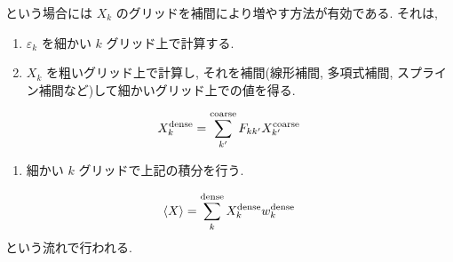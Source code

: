 \documentclass[letterpaper,10pt,dvipdfmx,openany]{sphinxmanual}
\begin{document}
\sphinxAtStartPar
という場合には \(X_k\) のグリッドを補間により増やす方法が有効である.
それは,
\begin{enumerate}
%
\item {} 
\sphinxAtStartPar
\(\varepsilon_k\) を細かい \(k\) グリッド上で計算する.

\item {} 
\sphinxAtStartPar
\(X_k\) を粗いグリッド上で計算し, それを補間(線形補間, 多項式補間,
スプライン補間など)して細かいグリッド上での値を得る.

\end{enumerate}
\begin{equation*}
\begin{split}\begin{align}
X_k^{\rm dense} = \sum_{k'}^{\rm coarse}
F_{k k'} X_{k'}^{\rm coarse}
\end{align}\end{split}
\end{equation*}\begin{enumerate}
%
\item {} 
\sphinxAtStartPar
細かい \(k\) グリッドで上記の積分を行う.

\end{enumerate}
\begin{equation*}
\begin{split}\begin{align}
\langle X \rangle = \sum_{k}^{\rm dense}
X_k^{\rm dense} w_k^{\rm dense}
\end{align}\end{split}
\end{equation*}
\sphinxAtStartPar
という流れで行われる.
\end{document}
